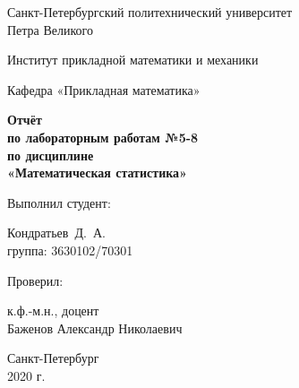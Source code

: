 \documentclass[12pt,a4paper]{article}
\begin{document}
	\begin{titlepage}
		\begin{center}			
			Санкт-Петербургский политехнический университет\\
			Петра Великого
			\vspace{0.25cm}
			
			Институт прикладной математики и механики
			
			Кафедра «Прикладная математика»
			\vfill
			
			\textbf{Отчёт\\
				по лабораторным работам №5-8\\
				по дисциплине\\
				«Математическая статистика»}\\[5mm]
			\bigskip
		\end{center}
		\vfill
		
		\hfill\begin{minipage}{0.45\textwidth}
			Выполнил студент:
			\vspace{0.2cm}
			
			Кондратьев~Д.~А.\\
			группа: 3630102/70301
		\end{minipage}%
		\bigskip
		
		\hfill\begin{minipage}{0.45\textwidth}
			Проверил:
			\vspace{0.2cm}
			
			к.ф.-м.н., доцент\\
			Баженов Александр Николаевич
		\end{minipage}%
		\vfill
		
		\begin{center}
			Санкт-Петербург\\
			2020 г.
		\end{center}
	\end{titlepage}
	
\tableofcontents{}
\listoffigures
\listoftables

\newpage
\end{document}
